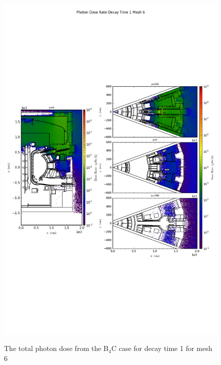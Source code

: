 \begin{figure}[ht!]
\centering
\includegraphics[trim={0cm 9cm 0cm 10cm},clip,scale=0.75]{../plots/final_model_with_b4c/Photon_Dose_Rate_Decay_Time_1_Mesh_6.png}
\label{fig:photons_dc1_no4bc_m6_flux}
\caption{The total photon dose from the B$_4$C case for decay time 1 for mesh 6}
\end{figure}
